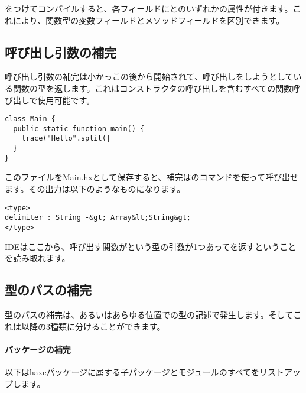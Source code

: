 をつけてコンパイルすると、各フィールドにとのいずれかの属性が付きます。これにより、関数型の変数フィールドとメソッドフィールドを区別できます。

\subsection{呼び出し引数の補完}
\label{cr-completion-call-argument}

呼び出し引数の補完は小かっこ\ic{(}の後から開始されて、呼び出しをしようとしている関数の型を返します。これはコンストラクタの呼び出しを含むすべての関数呼び出しで使用可能です。

\begin{lstlisting}
class Main {
  public static function main() {
    trace("Hello".split(|
  }
}
\end{lstlisting}

このファイルをMain.hxとして保存すると、補完はのコマンドを使って呼び出せます。その出力は以下のようなものになります。

\begin{lstlisting}
<type>
delimiter : String -&gt; Array&lt;String&gt;
</type>
\end{lstlisting}

IDEはここから、呼び出す関数がという型の引数が1つあってを返すということを読み取れます。


\subsection{型のパスの補完}
\label{cr-completion-type-path}

型のパスの補完は、あるいはあらゆる位置での型の記述で発生します。そしてこれは以降の3種類に分けることができます。

\paragraph{パッケージの補完}

以下はhaxeパッケージに属する子パッケージとモジュールのすべてをリストアップします。


